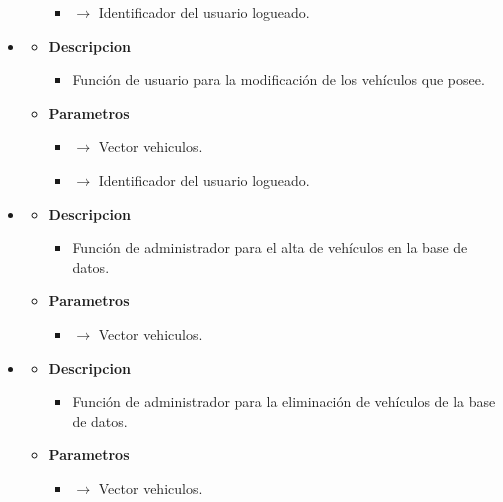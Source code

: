 \begin{itemize}
\begin{itemize}
\begin{itemize}
            \item {} $\rightarrow$ Identificador del usuario logueado.
		\end{itemize}
	\end{itemize}
   \item{}
	\begin{itemize}
		\item \textbf{Descripcion}
        \begin{itemize}
			\item Función de usuario para la modificación de los vehículos que posee.
		\end{itemize}
        \item \textbf{Parametros}
		\begin{itemize}
			\item {} $\rightarrow$ Vector vehiculos.
            \item {} $\rightarrow$ Identificador del usuario logueado.
		\end{itemize}
	\end{itemize}
    \item{}
	\begin{itemize}
		\item \textbf{Descripcion}
        \begin{itemize}
			\item Función de administrador para el alta de vehículos en la base de datos.
		\end{itemize}
        \item \textbf{Parametros}
		\begin{itemize}
			\item {} $\rightarrow$ Vector vehiculos.
         	\end{itemize}
	\end{itemize}
    \item{}
	\begin{itemize}
		\item \textbf{Descripcion}
        \begin{itemize}
			\item Función de administrador para la eliminación de vehículos de la base de datos.
		\end{itemize}
        \item \textbf{Parametros}
		\begin{itemize}
			\item {} $\rightarrow$ Vector vehiculos.

\end{itemize}
\end{itemize}
\end{itemize}
